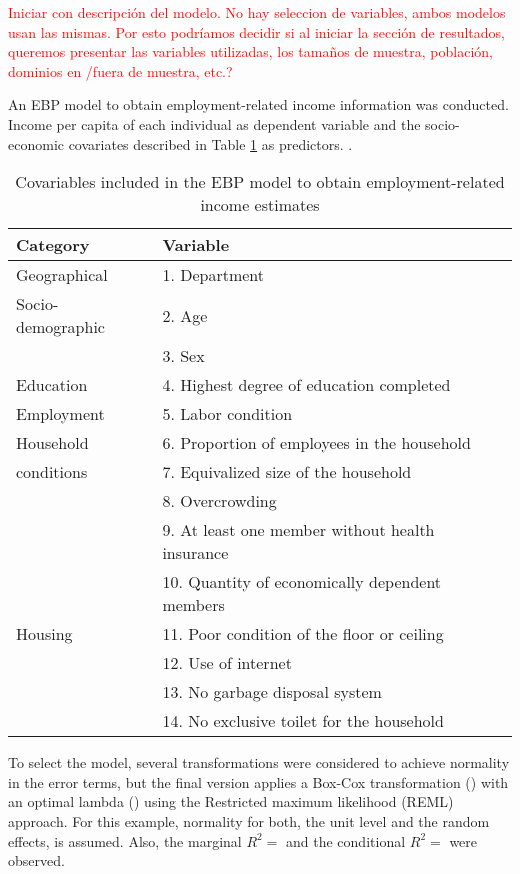 \documentclass[a4paper, 11pt]{article}
\begin{document}
\textcolor{red}{Iniciar con descripción del modelo. No hay seleccion de variables, ambos modelos usan las mismas. Por esto podríamos decidir si al iniciar la sección de resultados, queremos presentar las variables utilizadas, los tamaños de muestra, población, dominios en /fuera de muestra, etc.?}


An EBP model to obtain employment-related income information was conducted. Income per capita of each individual as dependent variable and the socio-economic covariates described in Table \ref{tab:variables} as predictors. . 

\begin{table}[ht!] 
\begin{center}
  \begin{threeparttable} 
	\centering
\small{
	\caption{Covariables included in the EBP model to obtain employment-related income estimates} \label{tab:variables}
		\begin{tabular}{ll}
		\hline
		Category& Variable \\
		\hline
				 Geographical & 1. Department \\
		 	Socio-demographic 	& 2. Age \\
				& 3. Sex \\
			Education	& 4. Highest degree of education completed   \\
			Employment	& 5. Labor condition \\
			Household 	& 6. Proportion of employees in the household \\
			 conditions& 7. Equivalized size of the household \\
			 	& 8. Overcrowding \\
				& 9. At least one member without health insurance \\		
				& 10. Quantity of economically dependent members\\
				Housing & 11. Poor condition of the floor or ceiling \\
				& 12. Use of internet\\
				 & 13. No garbage disposal system \\
				 & 14. No exclusive toilet for the household \\
			\hline
	\end{tabular}
	}
  \end{threeparttable}
  \end{center}
\end{table}


 To select the model, several transformations were considered to achieve normality in the error terms, but the final version applies a Box-Cox transformation (\citealt{box1964}) with an optimal lambda () using the Restricted maximum likelihood (REML) approach. For this example, normality for both, the unit level and the random effects, is assumed.  Also, the marginal $R^2 =  $ and the conditional $R^2=$ were observed.
\end{document}
